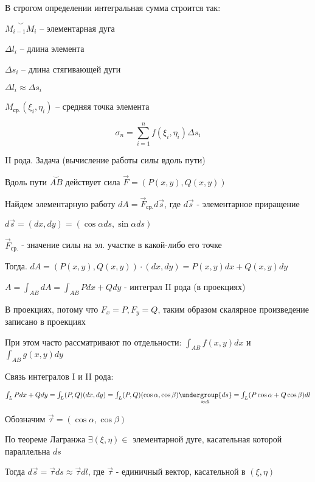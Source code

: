 \documentclass[12pt]{article}
\begin{document}
    \Nota В строгом определении интегральная сумма строится так:

    $\overset{\smile}{M_{i-1}M_i}$ -- элементарная дуга

    $\Delta l_i$ -- длина элемента

    $\Delta s_i$ -- длина стягивающей дуги

    $\Delta l_i \approx \Delta s_i$

    $M_{\text{ср.}}(\xi_i, \eta_i)$ -- средняя точка элемента

    \[\sigma_n = \sum_{i = 1}^n f(\xi_i, \eta_i) \Delta s_i\]

    \hypertarget{curvilinearintegralofsecondkind}{}

    II рода. Задача (вычисление работы силы вдоль пути)

    Вдоль пути $\overset{\smile}{AB}$ действует сила $\overrightarrow{F} = (P(x, y), Q(x, y))$

    Найдем элементарную работу $dA = \overrightarrow{F}_{\text{ср.}} d\overrightarrow{s}$, где $d\overrightarrow{s}$ - элементарное приращение

    $d\overrightarrow{s} = (dx, dy) = (\cos\alpha ds, \sin\alpha ds)$

    $\overrightarrow{F}_{\text{ср.}}$ - значение силы на эл. участке в какой-либо его точке

    Тогда. $dA = (P(x, y), Q(x, y)) \cdot (dx, dy) = P(x, y)dx + Q(x, y)dy$

    $A = \int_{AB} dA = \int_{AB} Pdx + Qdy$ - интеграл II рода (в проекциях)

    \Nota В проекциях, потому что $F_x = P, F_y = Q$, таким образом скалярное произведение записано в проекциях

    При этом часто рассматривают по отдельности: $\int_{AB} f(x, y) dx$ и $\int_{AB} g(x, y) dy$

    \hypertarget{connectionbetweencurvilinearintegrals}{}

    \Nota Связь интегралов I и II рода:

    $\int_L Pdx + Qdy = \int_L (P, Q)(dx, dy) = \int_L (P, Q) (\cos\alpha, \cos\beta) \underset{\approx dl}{\undergroup{ds}} =
    \int_L (P\cos\alpha + Q\cos\beta)dl$

    Обозначим $\overrightarrow{\tau} = (\cos\alpha, \cos\beta)$

    По теореме Лагранжа $\exists (\xi, \eta) \in$ элементарной дуге, касательная которой параллельна $ds$

    Тогда $d\overrightarrow{s} = \overrightarrow{\tau}ds \approx \overrightarrow{\tau}dl$, где $\overrightarrow{\tau}$ - единичный вектор, касательной в $(\xi, \eta)$
\end{document}
